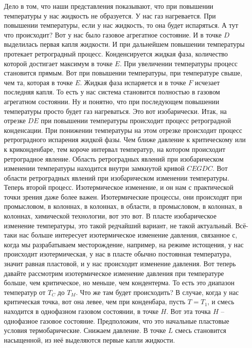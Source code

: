 \documentclass[main.tex]{subfiles}
\begin{document}
Дело в том, что наши представления показывают, что при повышении
температуры у нас жидкость не образуется.
У нас газ нагревается.
При повышении температуры, если у нас жидкость, то она будет испаряться.
А тут что происходит?
Вот у нас было газовое агрегатное состояние.
И в точке $D$ выделилась первая капля жидкости.
И при дальнейшем повышении температуры протекает ретроградный
процесс.
Конденсируется жидкая фаза, количество которой достигает
максимум в точке $E$.
При увеличении температуры процесс становится прямым.
Вот при повышении температуры, при температуре свыше, чем та, которая в точке $E$.
Жидкая фаза испаряется и в точке $F$ исчезает последняя капля.
То есть у нас система становится полностью в газовом агрегатном
состоянии.
Ну и понятно, что при последующем повышении температуры просто будет газ нагреваться.
Это вот изобарически.
Итак, на отрезке $DE$ при повышении температуры происходит процесс ретроградной конденсации.
При понижении температуры на этом отрезке происходит процесс ретроградного испарения жидкой фазы.
Чем ближе давление к критическому или к криконденбаре, тем короче интервал температур, на котором происходит ретроградное явление.
Область ретроградных явлений при изобарическом изменении температуры находится внутри замкнутой кривой $CEGDC$.
Вот области ретроградных явлений при изобарическом изменении температуры.
Теперь второй процесс.
Изотермическое изменение, и он нам с практической точки зрения даже более важен.
Изотермические процессы, они происходят при промысловом, в колоннах, в колоннах, в области, в промысловом, в колоннах, в колоннах, химической технологии, вот это вот.
В пласте изобарическое изменение температуры, это такой редчайший вариант, не такой актуальный.
Всё-таки нас больше интересует изотермическое изменение давления, связанное с, когда мы разрабатываем месторождение, например, на режиме истощения, у нас происходит изотермическая, у нас в пласте обычно постоянная температура, значит равная пластовой, и у нас происходит
изменение давления.
Вот теперь давайте рассмотрим изотермическое изменение давления при температуре больше, чем критическое, но меньше, чем кондентерма.
То есть это диапазон температур от $T_C$ до $T_M$.
Что же там будет происходить?
В случае, когда у нас критическая точка, вот она левее, чем
при конденбара, пусть $T=T_1$, и смесь находится в однофазном газовом состоянии, в точке $H$.
Вот эта точка $H$ -- однофазное газовое состояние.
Предположим, что это начальные пластовые условия термобарические.
Снижаем давление.
В точке $L$ смесь становится насыщенной, из неё выделяются
первые капли жидкости.
\end{document}
